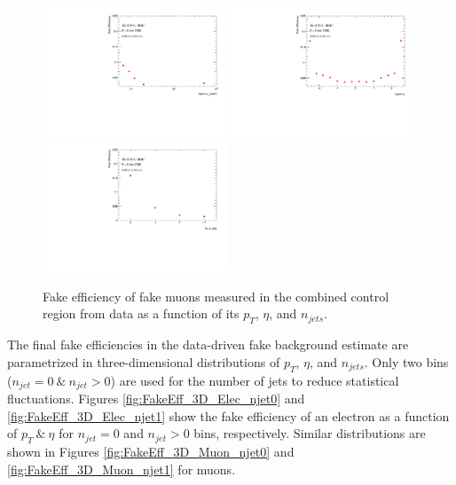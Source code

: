 \begin{figure}[htb]
        \begin{center}
        \includegraphics[width = 0.49\textwidth]{figures/Analysis/Background/Fake_Eff_Muon_pt_1D.pdf}
        \includegraphics[width = 0.49\textwidth]{figures/Analysis/Background/Fake_Eff_Muon_eta_1D.pdf} \\
        \includegraphics[width = 0.49\textwidth]{figures/Analysis/Background/Fake_Eff_Muon_jet_n_1D.pdf} 
        \end{center}
    \caption{Fake efficiency of fake muons measured in the combined control region from data as a function of its $p_{T}$, $\eta$, and $n_{jets}$. \label{fig:FakeEff_1D_Muon}}
\end{figure}

The final fake efficiencies in the data-driven fake background estimate are parametrized in three-dimensional distributions of $p_{T}$, $\eta$, and $n_{jets}$. Only two bins ($n_{jet}=0 ~\& ~ n_{jet} > 0$) are used for the number of jets to reduce statistical fluctuations. Figures \ref{fig:FakeEff_3D_Elec_njet0} and \ref{fig:FakeEff_3D_Elec_njet1} show the fake efficiency of an electron as a function of $p_{T} ~\&~ \eta$ for $n_{jet}=0 $ and $n_{jet}>0 $ bins, respectively. Similar distributions are shown in Figures \ref{fig:FakeEff_3D_Muon_njet0} and \ref{fig:FakeEff_3D_Muon_njet1} for muons.  

